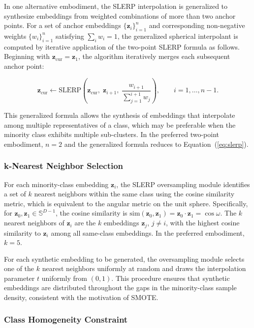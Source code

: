 \documentclass[12pt,letterpaper]{article}
\newcommand{\bz}{\mathbf{z}}
\begin{document}
In one alternative embodiment, the SLERP interpolation is generalized to
synthesize embeddings from weighted combinations of more than two anchor points.
For a set of anchor embeddings $\{\bz_i\}_{i=1}^n$ and corresponding
non-negative weights $\{w_i\}_{i=1}^n$ satisfying $\sum_i w_i = 1$, the
generalized spherical interpolant is computed by iterative application of the
two-point SLERP formula as follows. Beginning with $\bz_{\text{cur}} = \bz_1$,
the algorithm iteratively merges each subsequent anchor point:

\begin{equation}
  \bz_{\text{cur}} \leftarrow \text{SLERP}\!\left(\bz_{\text{cur}},\; \bz_{i+1},\;
    \frac{w_{i+1}}{\sum_{j=1}^{i+1} w_j}\right),
  \qquad i = 1, \ldots, n-1.
  \label{eq:slerp_general}
\end{equation}

\noindent This generalized formula allows the synthesis of embeddings that
interpolate among multiple representatives of a class, which may be preferable
when the minority class exhibits multiple sub-clusters. In the preferred
two-point embodiment, $n = 2$ and the generalized formula reduces to
Equation~(\ref{eq:slerp}).

\subsubsection{k-Nearest Neighbor Selection}

For each minority-class embedding $\bz_i$, the SLERP oversampling module
identifies a set of $k$ nearest neighbors within the same class using the
cosine similarity metric, which is equivalent to the angular metric on the
unit sphere. Specifically, for $\bz_0, \bz_1 \in \mathbb{S}^{D-1}$, the cosine
similarity is $\text{sim}(\bz_0, \bz_1) = \bz_0 \cdot \bz_1 = \cos\omega$.
The $k$ nearest neighbors of $\bz_i$ are the $k$ embeddings $\bz_j$,
$j \neq i$, with the highest cosine similarity to $\bz_i$ among all
same-class embeddings. In the preferred embodiment, $k = 5$.

For each synthetic embedding to be generated, the oversampling module selects
one of the $k$ nearest neighbors uniformly at random and draws the
interpolation parameter $t$ uniformly from $(0, 1)$. This procedure ensures
that synthetic embeddings are distributed throughout the gaps in the
minority-class sample density, consistent with the motivation of SMOTE.

\subsubsection{Class Homogeneity Constraint}
\end{document}
